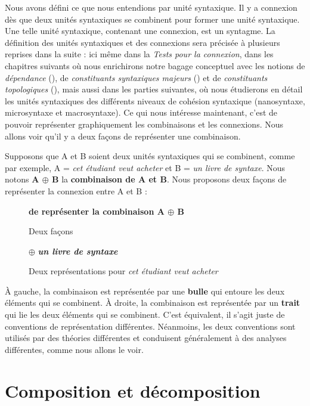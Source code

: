 Nous avons défini ce que nous entendions par unité syntaxique. Il y a connexion dès que deux unités syntaxiques se combinent pour former une unité syntaxique. Une telle unité syntaxique, contenant une connexion, est un syntagme. La définition des unités syntaxiques et des connexions sera précisée à plusieurs reprises dans la suite : ici même dans la  \textit{Tests pour la connexion}, dans les chapitres suivants où nous enrichirons notre bagage conceptuel avec les notions de \textit{dépendance} (), de \textit{constituants syntaxiques majeurs} () et de \textit{constituants topologiques} (), mais aussi dans les parties suivantes, où nous étudierons en détail les unités syntaxiques des différents niveaux de cohésion syntaxique (nanosyntaxe, microsyntaxe et macrosyntaxe). Ce qui nous intéresse maintenant, c’est de pouvoir représenter graphiquement les combinaisons et les connexions. Nous allons voir qu’il y a deux façons de représenter une combinaison.

Supposons que A et B soient deux unités syntaxiques qui se combinent, comme par exemple, A = \textit{cet étudiant veut acheter} et B = \textit{un livre de syntaxe}. Nous notons \textbf{A ${\oplus}$ B} la \textbf{combinaison de A et B}. Nous proposons deux façons de représenter la connexion entre A et B :

\begin{figure}
\caption{\label{fig:}Deux façons} \textbf{de représenter la combinaison A ${\oplus}$ B}
\end{figure}

\begin{figure}
\caption{\label{fig:}Deux représentations pour \textit{cet étudiant veut acheter}} \textbf{${\oplus}$} \textbf{\textit{un livre de syntaxe}}
\end{figure}

À gauche, la combinaison est représentée par une \textbf{bulle} qui entoure les deux éléments qui se combinent. À droite, la combinaison est représentée par un \textbf{trait} qui lie les deux éléments qui se combinent. C’est équivalent, il s’agit juste de conventions de représentation différentes. Néanmoins, les deux conventions sont utilisés par des théories différentes et conduisent généralement à des analyses différentes, comme nous allons le voir.

\section{Composition et décomposition}\label{sec:3.2.13}

